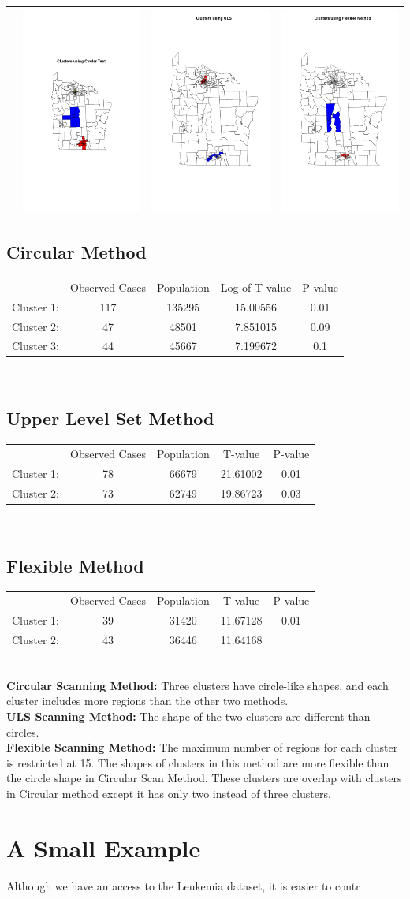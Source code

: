 \documentclass[12pt]{article}
\begin{document}
\begin{enumerate}
\begin{tabular}{|c|c|c|c|}
	 & \includegraphics[scale=0.3]{cluster_circular} & \includegraphics[scale=0.2]{cluster_uls} & \includegraphics[scale=0.2]{cluster_flexible}\\
	\hline
	\end{tabular}
	
	 \subsection {Circular Method} 
	
	 \begin{tabular}{|c|c|c|c|c|}
	 \hline
	 & Observed Cases & Population & Log of T-value& P-value  \\
	Cluster 1: & 117 & 135295 & 15.00556 & 0.01\\ 
	Cluster 2:& 47 & 48501 & 7.851015 & 0.09\\
	Cluster 3:& 44 & 45667 & 7.199672 & 0.1\\
	\hline
	\end{tabular} \\
	
	\subsection{Upper Level Set Method} 
	
	 \begin{tabular}{|c|c|c|c|c|}
	 \hline
	 & Observed Cases & Population & T-value &P-value  \\
	Cluster 1: & 78 & 66679 & 21.61002 & 0.01\\ 
	Cluster 2:& 73 & 62749 & 19.86723 & 0.03\\
	\hline
	\end{tabular} \\
	
	\subsection{Flexible Method} 
	
	 \begin{tabular}{|c|c|c|c|c|}
	 \hline
	 & Observed Cases & Population & T-value & P-value  \\
	Cluster 1: & 39 & 31420 & 11.67128& 0.01\\ 
	Cluster 2:& 43 & 36446 & 11.64168 &\\
	\hline
	\end{tabular} \\
	
	
	\textbf{Circular Scanning Method:} Three clusters have circle-like shapes, and each cluster includes more regions than the other two methods.\\
	\textbf{ULS Scanning Method:} The shape of the two clusters are different than circles. \\
	\textbf{Flexible Scanning Method:} The maximum number of regions for each cluster is restricted at 15.	
	The shapes of clusters in this method are more flexible than the circle shape in Circular Scan Method. These clusters are overlap with clusters in Circular method except it has only two instead of three clusters. \\
	
	\section{A Small Example}
	Although we have an access to the Leukemia dataset, it is easier to contr
\end{enumerate}
\end{document}
